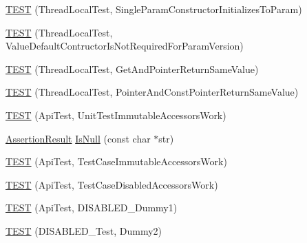 \begin{DoxyCompactItemize}
\item 
\hyperlink{namespacetesting_1_1internal_a5a52dd578217050e621ebd2aace97a70}{T\+E\+ST} (Thread\+Local\+Test, Single\+Param\+Constructor\+Initializes\+To\+Param)
\item 
\hyperlink{namespacetesting_1_1internal_a6dffc8331590224259b60e855ad07d03}{T\+E\+ST} (Thread\+Local\+Test, Value\+Default\+Contructor\+Is\+Not\+Required\+For\+Param\+Version)
\item 
\hyperlink{namespacetesting_1_1internal_a0e7c2d58a313bec0821df19f44351d84}{T\+E\+ST} (Thread\+Local\+Test, Get\+And\+Pointer\+Return\+Same\+Value)
\item 
\hyperlink{namespacetesting_1_1internal_aaed45d6ba960f02e8d3d042c606bc98e}{T\+E\+ST} (Thread\+Local\+Test, Pointer\+And\+Const\+Pointer\+Return\+Same\+Value)
\item 
\hyperlink{namespacetesting_1_1internal_a9ac879683abb06d1c0bba3a339ea2f40}{T\+E\+ST} (Api\+Test, Unit\+Test\+Immutable\+Accessors\+Work)
\item 
\hyperlink{classtesting_1_1_assertion_result}{Assertion\+Result} \hyperlink{namespacetesting_1_1internal_adcfd37a66bc4cb0e8291cf46e1a6c72b}{Is\+Null} (const char $\ast$str)
\item 
\hyperlink{namespacetesting_1_1internal_a33809333fe5b5f33c2bd56ddcdd1dbb6}{T\+E\+ST} (Api\+Test, Test\+Case\+Immutable\+Accessors\+Work)
\item 
\hyperlink{namespacetesting_1_1internal_a459d693357db8f8f48c26a8bee3ffb84}{T\+E\+ST} (Api\+Test, Test\+Case\+Disabled\+Accessors\+Work)
\item 
\hyperlink{namespacetesting_1_1internal_a9ed5f89c92532506899e3908e79af4de}{T\+E\+ST} (Api\+Test, D\+I\+S\+A\+B\+L\+E\+D\+\_\+\+Dummy1)
\item 
\hyperlink{namespacetesting_1_1internal_a4a84433419426d1c1b87ce998267b0d4}{T\+E\+ST} (D\+I\+S\+A\+B\+L\+E\+D\+\_\+\+Test, Dummy2)
\end{DoxyCompactItemize}
